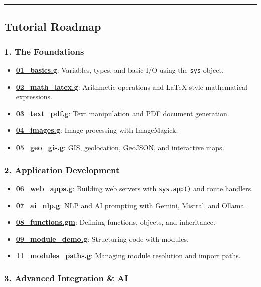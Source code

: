 \documentclass[
]{article}
\providecommand{\tightlist}{%
  \setlength{\itemsep}{0pt}\setlength{\parskip}{0pt}}
\begin{document}
\begin{center}\rule{0.5\linewidth}{0.5pt}\end{center}

\subsection{Tutorial Roadmap}\label{tutorial-roadmap}

\subsubsection{1. The Foundations}\label{the-foundations}

\begin{itemize}
\tightlist
\item
  \textbf{\url{01_basics.g}}: Variables, types, and basic I/O using the
  \texttt{sys} object.
\item
  \textbf{\url{02_math_latex.g}}: Arithmetic operations and LaTeX-style
  mathematical expressions.
\item
  \textbf{\url{03_text_pdf.g}}: Text manipulation and PDF document
  generation.
\item
  \textbf{\url{04_images.g}}: Image processing with ImageMagick.
\item
  \textbf{\url{05_geo_gis.g}}: GIS, geolocation, GeoJSON, and
  interactive maps.
\end{itemize}

\subsubsection{2. Application
Development}\label{application-development}

\begin{itemize}
\tightlist
\item
  \textbf{\url{06_web_apps.g}}: Building web servers with
  \texttt{sys.app()} and route handlers.
\item
  \textbf{\url{07_ai_nlp.g}}: NLP and AI prompting with Gemini, Mistral,
  and Ollama.
\item
  \textbf{\url{08_functions.gm}}: Defining functions, objects, and
  inheritance.
\item
  \textbf{\url{09_module_demo.g}}: Structuring code with modules.
\item
  \textbf{\url{11_modules_paths.g}}: Managing module resolution and
  import paths.
\end{itemize}

\subsubsection{3. Advanced Integration \&
AI}\label{advanced-integration-ai}
\end{document}
